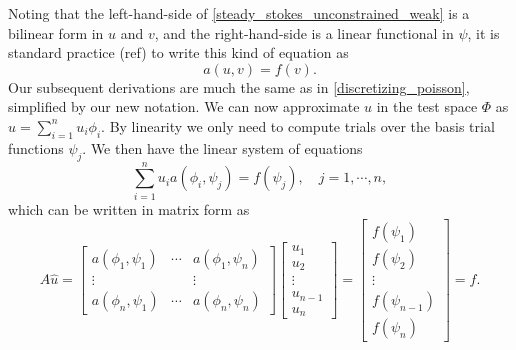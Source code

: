 Noting that the left-hand-side of \eqref{steady_stokes_unconstrained_weak} is a bilinear form in $u$ and $v$, and the right-hand-side
is a linear functional in $\psi$, it is standard practice (ref) to write this kind of equation as
\begin{equation}
    a(u, v) = f(v).
\end{equation}
Our subsequent derivations are much the same as in \ref{discretizing_poisson}, simplified by our new notation.
We can now approximate $u$ in the test space $\Phi$ as $\hat{u} = \sum_{i=1}^nu_i\phi_i$. By linearity we only need to compute
trials over the basis trial functions $\psi_j$.
We then have the linear system of equations
\begin{equation}\label{elliptic_bilinear_form}
    \sum_{i=1}^n u_i a\left(\phi_i, \psi_j\right) = f(\psi_j),\quad j=1,\cdots,n,
\end{equation}
which can be written in matrix form as
\begin{equation}\label{elliptic_bilinear_form_matrix}
    A\hat{u} = \begin{bmatrix}
            a(\phi_1, \psi_1) & \cdots & a(\phi_1, \psi_n) \\
            \vdots & & \vdots \\
            a(\phi_n, \psi_1) & \cdots & a(\phi_n, \psi_n)
            \end{bmatrix}
    \begin{bmatrix} u_1 \\ u_2 \\ \vdots \\ u_{n-1} \\ u_n \end{bmatrix}
    =
    \begin{bmatrix} f(\psi_1) \\ f(\psi_2) \\ \vdots \\ f(\psi_{n-1}) \\ f(\psi_{n}) \end{bmatrix}
    = \hat{f}.
\end{equation}
